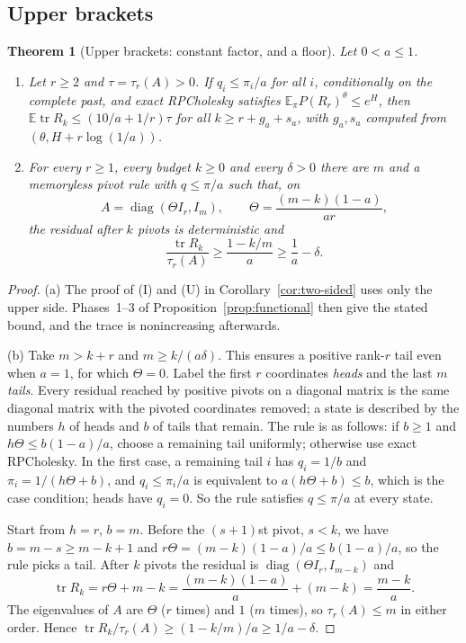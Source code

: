 \documentclass[11pt]{article}
\newtheorem{theorem}{Theorem}[section]
\theoremstyle{definition}\newtheorem{definition}[theorem]{Definition}
\theoremstyle{remark}\newtheorem{remark}[theorem]{Remark}
\newcommand{\E}{\mathbb E}
\newcommand{\tr}{\operatorname{tr}}
\newcommand{\diag}{\operatorname{diag}}
\newcommand{\1}{\mathbf 1}
\begin{document}
\subsection{Upper brackets}
\begin{theorem}[Upper brackets: constant factor, and a floor]\label{thm:upper}
Let $0<a\le1$.
\begin{enumerate}[label=\textup{(\alph*)}]
\item Let $r\ge2$ and $\tau=\tau_r(A)>0$. If $q_i\le\pi_i/a$ for all $i$,
 conditionally on the complete past, and exact RPCholesky satisfies
 $\E_\pi P(R_r)^\theta\le e^H$, then $\E\tr R_k\le(10/a+1/r)\tau$ for all
 $k\ge r+g_a+s_a$, with $g_a,s_a$ computed from $(\theta,H+r\log(1/a))$.
\item For every $r\ge1$, every budget $k\ge0$ and every $\delta>0$ there
 are $m$ and a memoryless pivot rule with $q\le\pi/a$ such that, on
 \[
  A=\diag(\Theta I_r,I_m),\qquad \Theta=\frac{(m-k)(1-a)}{ar},
 \]
 the residual after $k$ pivots is deterministic and
 \[
  \frac{\tr R_k}{\tau_r(A)}\ge\frac{1-k/m}a\ge\frac1a-\delta .
 \]
\end{enumerate}
\end{theorem}
\begin{proof}
(a) The proof of (I) and (U) in Corollary~\ref{cor:two-sided} uses only
the upper side. Phases~1--3 of Proposition~\ref{prop:functional} then
give the stated bound, and the trace is nonincreasing afterwards.

(b) Take $m>k+r$ and $m\ge k/(a\delta)$. This ensures a positive
rank-$r$ tail even when $a=1$, for which $\Theta=0$. Label the first $r$ coordinates
\emph{heads} and the last $m$ \emph{tails}. Every residual reached by
positive pivots on a diagonal matrix is the same diagonal matrix with
the pivoted coordinates removed; a state is described by the numbers $h$
of heads and $b$ of tails that remain. The rule is as follows: if
$b\ge1$ and $h\Theta\le b(1-a)/a$, choose a remaining tail uniformly;
otherwise use exact RPCholesky. In the first case, a remaining tail $i$
has $q_i=1/b$ and $\pi_i=1/(h\Theta+b)$, and $q_i\le\pi_i/a$ is equivalent to
$a(h\Theta+b)\le b$, which is the case condition; heads have $q_i=0$. So the
rule satisfies $q\le\pi/a$ at every state.

Start from $h=r$, $b=m$. Before the $(s+1)$st pivot, $s<k$, we have
$b=m-s\ge m-k+1$ and $r\Theta=(m-k)(1-a)/a\le b(1-a)/a$, so the rule picks a
tail. After $k$ pivots the residual is $\diag(\Theta I_r,I_{m-k})$ and
\[
 \tr R_k=r\Theta+m-k=\frac{(m-k)(1-a)}a+(m-k)=\frac{m-k}a .
\]
The eigenvalues of $A$ are $\Theta$ ($r$ times) and $1$ ($m$ times), so
$\tau_r(A)\le m$ in either order. Hence
$\tr R_k/\tau_r(A)\ge(1-k/m)/a\ge1/a-\delta$.
\end{proof}
\end{document}

